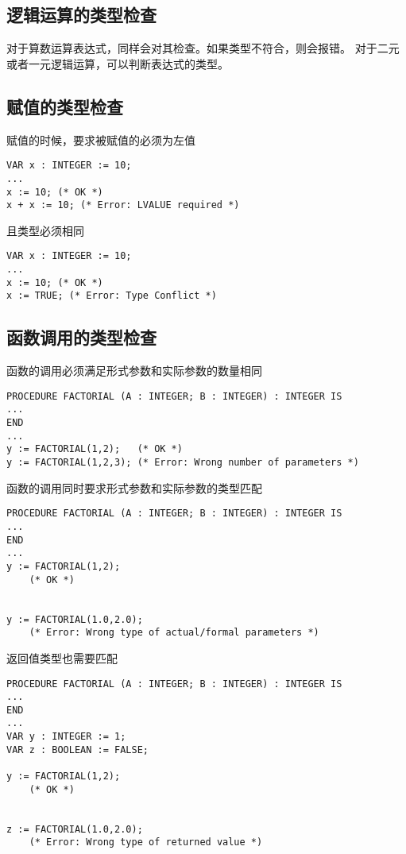 ﻿\documentclass{article}
\begin{document}
\subsection{逻辑运算的类型检查}
对于算数运算表达式，同样会对其检查。如果类型不符合，则会报错。
对于二元或者一元逻辑运算，可以判断表达式的类型。


\subsection{赋值的类型检查}

赋值的时候，要求被赋值的必须为左值
\begin{lstlisting}
VAR x : INTEGER := 10;
...
x := 10; (* OK *)
x + x := 10; (* Error: LVALUE required *)
\end{lstlisting}

且类型必须相同
\begin{lstlisting}
VAR x : INTEGER := 10;
...
x := 10; (* OK *)
x := TRUE; (* Error: Type Conflict *)
\end{lstlisting}

\subsection{函数调用的类型检查}
函数的调用必须满足形式参数和实际参数的数量相同
\begin{lstlisting}
PROCEDURE FACTORIAL (A : INTEGER; B : INTEGER) : INTEGER IS 
...
END
...
y := FACTORIAL(1,2);   (* OK *)
y := FACTORIAL(1,2,3); (* Error: Wrong number of parameters *)
\end{lstlisting}

函数的调用同时要求形式参数和实际参数的类型匹配
\begin{lstlisting}
PROCEDURE FACTORIAL (A : INTEGER; B : INTEGER) : INTEGER IS 
...
END
...
y := FACTORIAL(1,2);     
    (* OK *)
    
    
y := FACTORIAL(1.0,2.0); 
    (* Error: Wrong type of actual/formal parameters *)
\end{lstlisting}

返回值类型也需要匹配
\begin{lstlisting}
PROCEDURE FACTORIAL (A : INTEGER; B : INTEGER) : INTEGER IS 
...
END
...
VAR y : INTEGER := 1;
VAR z : BOOLEAN := FALSE;

y := FACTORIAL(1,2);     
    (* OK *)
    
    
z := FACTORIAL(1.0,2.0); 
    (* Error: Wrong type of returned value *)
\end{lstlisting}
\end{document}
